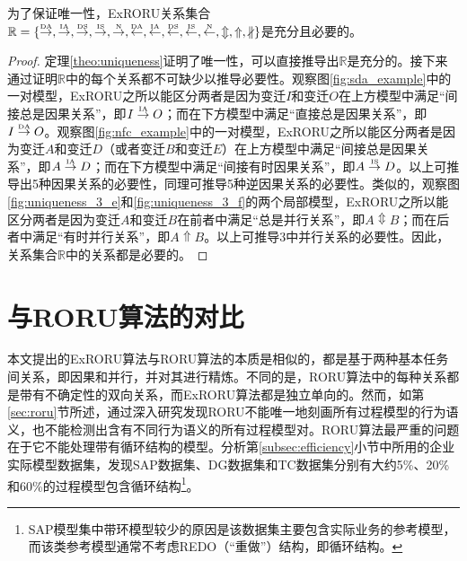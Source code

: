 \begin{theorem}[充分性和必要性]\label{theo:necessity_sufficiency}
为了保证唯一性，ExRORU关系集合$\mathbb{R}=\{\overset{\text{\tiny{DA}}}{\rightarrow},\overset{\text{\tiny{IA}}}{\rightarrow},\overset{\text{\tiny{DS}}}{\rightarrow},\overset{\text{\tiny{IS}}}{\rightarrow},\overset{\text{\tiny{N}}}{\rightarrow},\overset{\text{\tiny{DA}}}{\leftarrow},\overset{\text{\tiny{IA}}}{\leftarrow},\overset{\text{\tiny{DS}}}{\leftarrow},\overset{\text{\tiny{IS}}}{\leftarrow},\overset{\text{\tiny{N}}}{\leftarrow},\Updownarrow,\Uparrow,\nparallel\}$是充分且必要的。
\end{theorem}

\begin{proof}
定理\ref{theo:uniqueness}证明了唯一性，可以直接推导出$\mathbb{R}$是充分的。接下来通过证明$\mathbb{R}$中的每个关系都不可缺少以推导必要性。观察图\ref{fig:sda_example}中的一对模型，ExRORU之所以能区分两者是因为变迁$I$和变迁$O$在上方模型中满足“间接总是因果关系”，即$I\overset{\text{\tiny{IA}}}{\rightarrow}O$；而在下方模型中满足“直接总是因果关系”，即$I\overset{\text{\tiny{DA}}}{\rightarrow}O$。观察图\ref{fig:nfc_example}中的一对模型，ExRORU之所以能区分两者是因为变迁$A$和变迁$D$（或者变迁$B$和变迁$E$）在上方模型中满足“间接总是因果关系”，即$A\overset{\text{\tiny{IA}}}{\rightarrow}D$；而在下方模型中满足“间接有时因果关系”，即$A\overset{\text{\tiny{IS}}}{\rightarrow}D$。以上可推导出5种因果关系的必要性，同理可推导5种逆因果关系的必要性。类似的，观察图\ref{fig:uniqueness_3_e}和\ref{fig:uniqueness_3_f}的两个局部模型，ExRORU之所以能区分两者是因为变迁$A$和变迁$B$在前者中满足“总是并行关系”，即$A\Updownarrow B$；而在后者中满足“有时并行关系”，即$A\Uparrow B$。以上可推导3中并行关系的必要性。因此，关系集合$\mathbb{R}$中的关系都是必要的。
\end{proof}

\section{与RORU算法的对比}\label{sec:vs_roru}
本文提出的ExRORU算法与RORU算法的本质是相似的，都是基于两种基本任务间关系，即因果和并行，并对其进行精炼。不同的是，RORU算法中的每种关系都是带有不确定性的双向关系，而ExRORU算法都是独立单向的。然而，如第\ref{sec:roru}节所述，通过深入研究发现RORU不能唯一地刻画所有过程模型的行为语义，也不能检测出含有不同行为语义的所有过程模型对。RORU算法最严重的问题在于它不能处理带有循环结构的模型。分析第\ref{subsec:efficiency}小节中所用的企业实际模型数据集，发现SAP数据集、DG数据集和TC数据集分别有大约5\%、20\%和60\%的过程模型包含循环结构\footnote{SAP模型集中带环模型较少的原因是该数据集主要包含实际业务的参考模型，而该类参考模型通常不考虑REDO（“重做”）结构，即循环结构。}。

